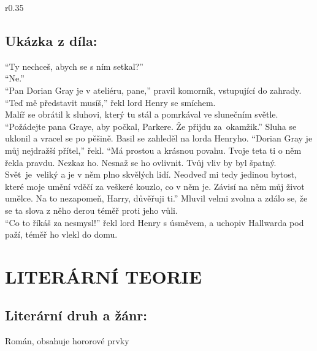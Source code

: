 \documentclass[A4paper]{extarticle} %
\begin{document}
\noindent\begin{wrapfigure}{r}{0.35\textwidth}
\tiny

\subsection*{Ukázka z díla:}
\setlength{\parindent}{3pt}
\noindent
\enquote{Ty nechceš, abych se s ním setkal?} \\
\enquote{Ne.} \\
\enquote{Pan Dorian Gray je v ateliéru, pane,} pravil komorník, vstupující do zahrady. \\
\enquote{Teď mě představit musíš,} řekl lord Henry se smíchem. \\
Malíř se obrátil k sluhovi, který tu stál a pomrkával ve slunečním světle.
\enquote{Požádejte pana Graye, aby počkal, Parkere. Že přijdu za~okamžik.}
Sluha se uklonil a vracel se po pěšině.
Basil se zahleděl na lorda Henryho.
\enquote{Dorian Gray je můj nejdražší přítel,} řekl.
\enquote{Má prostou a krásnou povahu.
Tvoje teta ti o něm řekla pravdu.
Nezkaz ho.
Nesnaž se ho ovlivnit.
Tvůj vliv by byl špatný.
Svět~je~veliký a je v něm plno skvělých lidí.
Neodveď mi tedy jedinou bytost, které moje umění vděčí za veškeré kouzlo, co v něm je.
Závisí na něm můj život umělce.
Na to nezapomeň, Harry, důvěřuji ti.}
Mluvil velmi zvolna a zdálo se, že se ta slova z něho derou téměř proti jeho vůli. \\
\enquote{Co to říkáš za nesmysl!} řekl lord Henry s úsměvem, a uchopiv Hallwarda pod paží, téměř ho vlekl do domu. 
\end{wrapfigure}

\section*{LITERÁRNÍ TEORIE}

\subsection*{Literární druh a žánr:}
\noindent
Román, obsahuje hororové prvky


\end{document}
